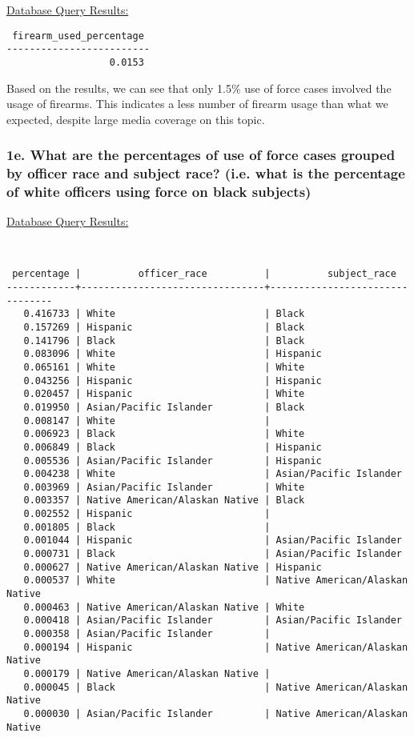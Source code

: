 \documentclass[10pt]{article}
\begin{document}
\underline{Database Query Results:}

\begin{verbatim}
 firearm_used_percentage
-------------------------
                  0.0153
\end{verbatim}

Based on the results, we can see that only 1.5\% use of force cases involved the usage of firearms. This indicates a less number of firearm usage than what we expected, despite large media coverage on this topic.


\subsubsection*{1e. What are the percentages of use of force cases grouped by officer race and subject race? (i.e. what is the percentage of white officers using force on black subjects)}

\underline{Database Query Results:}

\begin{verbatim}


 percentage |          officer_race          |          subject_race
------------+--------------------------------+--------------------------------
   0.416733 | White                          | Black
   0.157269 | Hispanic                       | Black
   0.141796 | Black                          | Black
   0.083096 | White                          | Hispanic
   0.065161 | White                          | White
   0.043256 | Hispanic                       | Hispanic
   0.020457 | Hispanic                       | White
   0.019950 | Asian/Pacific Islander         | Black
   0.008147 | White                          |
   0.006923 | Black                          | White
   0.006849 | Black                          | Hispanic
   0.005536 | Asian/Pacific Islander         | Hispanic
   0.004238 | White                          | Asian/Pacific Islander
   0.003969 | Asian/Pacific Islander         | White
   0.003357 | Native American/Alaskan Native | Black
   0.002552 | Hispanic                       |
   0.001805 | Black                          |
   0.001044 | Hispanic                       | Asian/Pacific Islander
   0.000731 | Black                          | Asian/Pacific Islander
   0.000627 | Native American/Alaskan Native | Hispanic
   0.000537 | White                          | Native American/Alaskan Native
   0.000463 | Native American/Alaskan Native | White
   0.000418 | Asian/Pacific Islander         | Asian/Pacific Islander
   0.000358 | Asian/Pacific Islander         |
   0.000194 | Hispanic                       | Native American/Alaskan Native
   0.000179 | Native American/Alaskan Native |
   0.000045 | Black                          | Native American/Alaskan Native
   0.000030 | Asian/Pacific Islander         | Native American/Alaskan Native
\end{verbatim}
\end{document}
